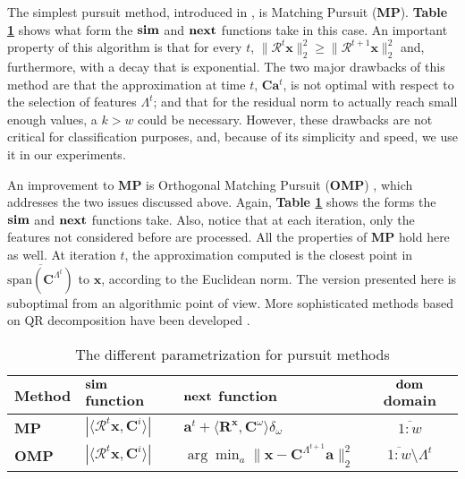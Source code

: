 \documentclass[runningheads,a4paper]{llncs}
\newcommand{\hcrange}[2]{\overline{{#1}\colon\!\!{#2}}}
\begin{document}
The simplest pursuit method, introduced in \cite{matchingpursuit1}, is Matching Pursuit (\textbf{MP}). \textbf{Table \ref{table:PursuitParametrization}} shows what form the $\text{\textbf{sim}}$ and $\text{\textbf{next}}$ functions take in this case. An important property of this algorithm is that for every $t$, $\|\mathcal{R}^t\textbf{x}\|_2^2 \geq \|\mathcal{R}^{t+1}\textbf{x}\|_2^2$ and, furthermore, with a decay that is exponential. The two major drawbacks of this method are that the approximation at time $t$, $\textbf{C}\textbf{a}^t$, is not optimal with respect to the selection of features $\Lambda^t$; and that for the residual norm to actually reach small enough values, a $k > w$ could be necessary. However, these drawbacks are not critical for classification purposes, and, because of its simplicity and speed, we use it in our experiments.

An improvement to \textbf{MP} is Orthogonal Matching Pursuit (\textbf{OMP}) \cite{matchingpursuit2,orthopursuit,pursuitdifferences}, which addresses the two issues discussed above. Again, \textbf{Table \ref{table:PursuitParametrization}} shows the forms the $\text{\textbf{sim}}$ and $\text{\textbf{next}}$ functions take. Also, notice that at each iteration, only the features not considered before are processed. All the properties of \textbf{MP} hold here as well. At iteration $t$, the approximation computed is the closest point in $\overline{\text{span}(\textbf{C}^{\Lambda^t})}$ to $\textbf{x}$, according to the Euclidean norm. The version presented here is suboptimal from an algorithmic point of view. More sophisticated methods based on QR decomposition have been developed \cite{matchingpursuit2,pursuitdifferences}.

\renewcommand{\arraystretch}{1.5}
\begin{table}
  \caption{The different parametrization for pursuit methods}
  \label{table:PursuitParametrization}
  \begin{tabularx}{\textwidth}{|l|>{\centering}X|>{\centering}X|c|}
       \hline
        Method & $\text{\textbf{sim}}$ function & $\text{\textbf{next}}$ function & $\text{\textbf{dom}}$ domain\\ \hline \hline
        \textbf{MP} & $\left| \langle \mathcal{R}^t\textbf{x} , \textbf{C}^i \rangle \right|$ & $\textbf{a}^t + \langle \textbf{R}^\textbf{x} , \textbf{C}^\omega \rangle \delta_\omega$ & $\hcrange{1}{w}$ \\  \hline
        \textbf{OMP} & $\left| \langle \mathcal{R}^t\textbf{x} , \textbf{C}^i \rangle \right|$ & $\arg\min_{a} {\| \textbf{x} - \textbf{C}^{\Lambda^{t+1}}\textbf{a} \|_2^2}$ & $\hcrange{1}{w} \setminus \Lambda^t$ \\
       \hline
    \end{tabularx}
\end{table}
\renewcommand{\arraystretch}{1.0}
\end{document}

